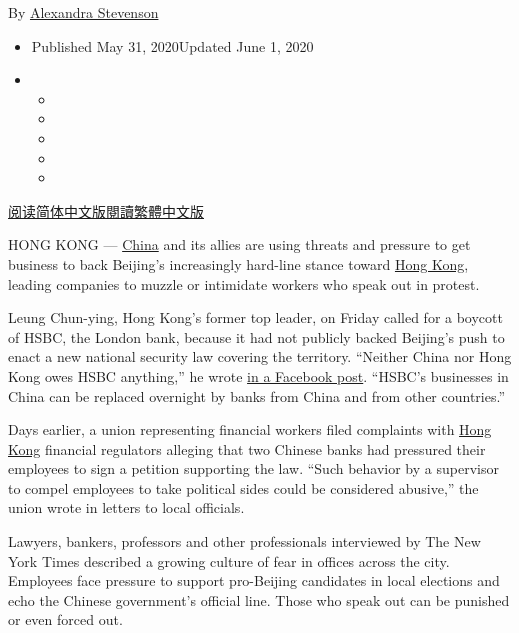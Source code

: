 By
\href{https://www.nytimes3xbfgragh.onion/by/alexandra-stevenson}{Alexandra
Stevenson}

\begin{itemize}
\item
  Published May 31, 2020Updated June 1, 2020
\item
  \begin{itemize}
  \item
  \item
  \item
  \item
  \item
  \end{itemize}
\end{itemize}

\href{https://cn.nytimes3xbfgragh.onion/business/20200601/hong-kong-china-business/}{阅读简体中文版}\href{https://cn.nytimes3xbfgragh.onion/business/20200601/hong-kong-china-business/zh-hant/}{閱讀繁體中文版}

HONG KONG ---
\href{https://www.nytimes3xbfgragh.onion/2020/06/02/world/asia/china-george-floyd.html}{China}
and its allies are using threats and pressure to get business to back
Beijing's increasingly hard-line stance toward
\href{https://www.nytimes3xbfgragh.onion/2020/06/01/world/asia/Hong-kong-Tiananmen-vigil-banned.html}{Hong
Kong}, leading companies to muzzle or intimidate workers who speak out
in protest.

Leung Chun-ying, Hong Kong's former top leader, on Friday called for a
boycott of HSBC, the London bank, because it had not publicly backed
Beijing's push to enact a new national security law covering the
territory. ``Neither China nor Hong Kong owes HSBC anything,'' he wrote
\href{https://www.facebookcorewwwi.onion/leung.cy.108/posts/1176081609420981}{in
a Facebook post}. ``HSBC's businesses in China can be replaced overnight
by banks from China and from other countries.''

Days earlier, a union representing financial workers filed complaints
with
\href{https://www.nytimes3xbfgragh.onion/2020/06/01/world/asia/Hong-kong-Tiananmen-vigil-banned.html}{Hong
Kong} financial regulators alleging that two Chinese banks had pressured
their employees to sign a petition supporting the law. ``Such behavior
by a supervisor to compel employees to take political sides could be
considered abusive,'' the union wrote in letters to local officials.

Lawyers, bankers, professors and other professionals interviewed by The
New York Times described a growing culture of fear in offices across the
city. Employees face pressure to support pro-Beijing candidates in local
elections and echo the Chinese government's official line. Those who
speak out can be punished or even forced out.

